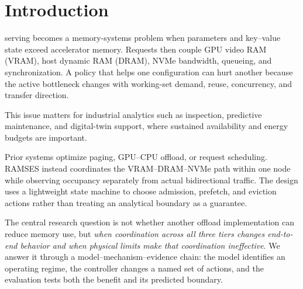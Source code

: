 \section{Introduction}\label{sec:introduction}
 serving becomes a memory-systems problem when parameters and key--value state exceed accelerator memory. Requests then couple GPU video RAM (VRAM), host dynamic RAM (DRAM), NVMe bandwidth, queueing, and synchronization. A policy that helps one configuration can hurt another because the active bottleneck changes with working-set demand, reuse, concurrency, and transfer direction.

This issue matters for industrial analytics such as inspection, predictive maintenance, and digital-twin support, where sustained availability and energy budgets are important. 

Prior systems optimize paging, GPU--CPU offload, or request scheduling. RAMSES instead coordinates the VRAM--DRAM--NVMe path within one node while observing occupancy separately from actual bidirectional traffic. The design uses a lightweight state machine to choose admission, prefetch, and eviction actions rather than treating an analytical boundary as a guarantee.

The central research question is not whether another offload implementation can
reduce memory use, but \emph{when coordination across all three tiers changes
end-to-end behavior and when physical limits make that coordination
ineffective}. We answer it through a model--mechanism--evidence chain: the model
identifies an operating regime, the controller changes a named set of actions,
and the evaluation tests both the benefit and its predicted boundary.

